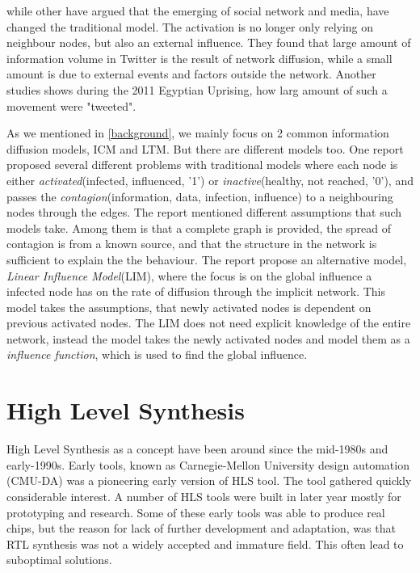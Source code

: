 while other\cite{InfoDiffAndExternalInfluInNetworks} have argued that the emerging of social network and media, have changed the traditional model. The activation is no longer only relying on neighbour nodes, but also an external influence. They found that large amount of  information volume in Twitter is the result of network diffusion, while a small amount is due to external events and factors outside the network\citep{InfoDiffAndExternalInfluInNetworks}. Another studies shows during the 2011 Egyptian Uprising, how larg amount of such a movement were "tweeted"\cite{Starbird:2012:RRI:2145204.2145212}.


As we mentioned in \ref{background}, we mainly focus on 2 common information diffusion models, ICM and LTM. But there are different models too. One report\cite{5694014} proposed several different problems with traditional models where each node is either \textit{activated}(infected, influenced, '1') or \textit{inactive}(healthy, not reached, '0'), and passes the \textit{contagion}(information, data, infection, influence) to a neighbouring nodes through the edges. The report mentioned different assumptions that such models take. Among them is that a complete graph is provided, the spread of contagion is from a known source, and that the structure in the network is sufficient to explain the the behaviour\citep{5694014}. The report propose an alternative model, \textit{Linear Influence Model}(LIM), where the focus is on the global influence a infected node has on the rate of diffusion through the implicit network. This model takes the assumptions, that newly activated nodes is dependent on previous activated nodes. The LIM does not need explicit knowledge of the entire network, instead the model takes the newly activated nodes and model them as a \textit{influence function}, which is used to find the global influence. 	



\section{High Level Synthesis}
High Level Synthesis as a concept have been around since the mid-1980s and early-1990s. Early tools, known as Carnegie-Mellon University design automation (CMU-DA)\citep{1085036}\citep{Parker:1979:CDA:800292.811694} was a pioneering early version of HLS tool. The tool gathered quickly considerable interest. A number of HLS tools were built in later year mostly for prototyping and research\cite{Granacki:1985:AAD:317825.317970}\citep{Paulin:1986:HMA:318013.318055}\citep{4069894}. Some of these early tools was able to produce real chips, but the reason for lack of further development and adaptation, was that RTL synthesis was not a widely accepted and immature field. This often lead to suboptimal solutions. 

